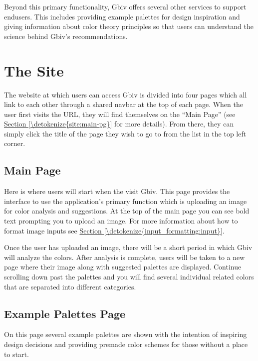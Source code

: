 \documentclass[letterpaper,10pt,english,openany,oneside]{sphinxmanual}
\begin{document}
\sphinxAtStartPar
Beyond this primary functionality, Gbiv offers several other services to support end\sphinxhyphen{}users. This includes providing example palettes for design inspiration and giving information about color theory principles so that users can understand the science behind Gbiv’s recommendations.

\sphinxstepscope


\chapter{The Site}
\label{\detokenize{site:the-site}}\label{\detokenize{site:site}}\label{\detokenize{site::doc}}
\sphinxAtStartPar
The website at which users can access Gbiv is divided into four pages which all link to each other through a shared navbar at the top of each page. When the user first visits the URL, they will find themselves on the “Main Page” (see \hyperref[\detokenize{site:main-pg}]{Section \ref{\detokenize{site:main-pg}}} for more details). From there, they can simply click the title of the page they wish to go to from the list in the top left corner.


\section{Main Page}
\label{\detokenize{site:main-page}}\label{\detokenize{site:main-pg}}
\sphinxAtStartPar
Here is where users will start when the visit Gbiv. This page provides the interface to use the application’s primary function which is uploading an image for color analysis and suggestions. At the top of the main page you can see bold text prompting you to upload an image. For more information about how to format image inputs see \hyperref[\detokenize{input_formatting:input}]{Section \ref{\detokenize{input_formatting:input}}}.

\sphinxAtStartPar
Once the user has uploaded an image, there will be a short period in which Gbiv will analyze the colors. After analysis is complete, users will be taken to a new page where their image along with suggested palettes are displayed.  Continue scrolling down past the palettes and you will find several individual related colors that are separated into different categories.


\section{Example Palettes Page}
\label{\detokenize{site:example-palettes-page}}\label{\detokenize{site:ex-palettes-pg}}
\sphinxAtStartPar
On this page several example palettes are shown with the intention of inspiring design decisions and providing pre\sphinxhyphen{}made color schemes for those without a place to start.
\end{document}
